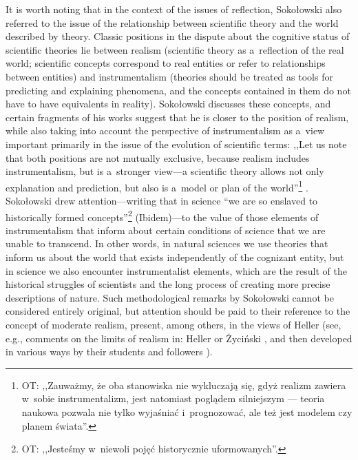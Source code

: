 It is worth noting that in the context of the issues of reflection, Sokołowski also referred to the issue of the relationship between scientific theory and the world described by theory. Classic positions in the dispute about the cognitive status of scientific theories lie between realism (scientific theory as a~reflection of the real world; scientific concepts correspond to real entities or refer to relationships between entities) and instrumentalism (theories should be treated as tools for predicting and explaining phenomena, and the concepts contained in them do not have to have equivalents in reality). Sokołowski discusses these concepts, and certain fragments of his works suggest that he is closer to the position of realism, while also taking into account the perspective of instrumentalism as a~view important primarily in the issue of the evolution of scientific terms: ,,Let us note that both positions are not mutually exclusive, because realism includes instrumentalism, but is a~stronger view---a scientific theory allows not only explanation and prediction, but also is a~model or plan of the world''\footnote{OT: ,,Zauważmy, że oba stanowiska nie wykluczają się, gdyż realizm zawiera w~sobie instrumentalizm, jest natomiast poglądem silniejszym --- teoria naukowa pozwala nie tylko wyjaśniać i~prognozować, ale też jest modelem czy planem świata''.} 
\parencite[][]{}. %
 Sokołowski drew attention---writing that in science ``we are so enslaved to historically formed concepts''\footnote{OT: ,,Jesteśmy w~niewoli pojęć historycznie uformowanych''.} (Ibidem)---to the value of those elements of instrumentalism that inform about certain conditions of science that we are unable to transcend. In other words, in natural sciences we use theories that inform us about the world that exists independently of the cognizant entity, but in science we also encounter instrumentalist elements, which are the result of the historical struggles of scientists and the long process of creating more precise descriptions of nature. Such methodological remarks by Sokołowski cannot be considered entirely original, but attention should be paid to their reference to the concept of moderate realism, present, among others, in the views of Heller (see, e.g., comments on the limits of realism in: Heller 
\parencite*[][pp.80–81]{Heller1992Filozofia} %
 or Życiński 
\parencite[e.g.,][]{}, %
 and then developed in various ways by their students and followers 
\parencites[e.g.,][]{Sierotowicz1997Realizm}[][]{}%
).



